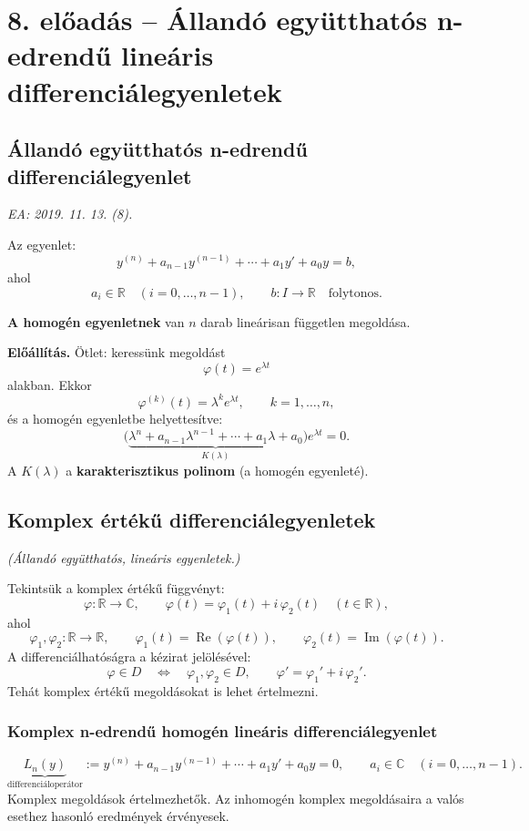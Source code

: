 \graphicspath{{lectures/08_eloadas_abrak/}}

\section{8. előadás -- Állandó együtthatós n-edrendű lineáris differenciálegyenletek}

\subsection{Állandó együtthatós n-edrendű differenciálegyenlet}
\textit{EA: 2019. 11. 13. (8).}

Az egyenlet:
\[
 y^{(n)}+a_{n-1}y^{(n-1)}+\cdots+a_1y'+a_0y=b,
\]
ahol
\[
 a_i\in\mathbb R\quad(i=0,\ldots,n-1),\qquad
 b:I\longrightarrow\mathbb R\quad\text{folytonos}.
\]

\textbf{A homogén egyenletnek} van $n$ darab lineárisan független
megoldása.

\textbf{Előállítás.} Ötlet: keressünk megoldást
\[
 \varphi(t)=e^{\lambda t}
\]
alakban. Ekkor
\[
 \varphi^{(k)}(t)=\lambda^k e^{\lambda t},
 \qquad k=1,\ldots,n,
\]
és a homogén egyenletbe helyettesítve:
\[
 \bigl(\underbrace{\lambda^n+a_{n-1}\lambda^{n-1}
              +\cdots+a_1\lambda+a_0}_{K(\lambda)}\bigr)
 e^{\lambda t}=0.
\]
A $K(\lambda)$ a \textbf{karakterisztikus polinom}
(a homogén egyenleté).

\subsection{Komplex értékű differenciálegyenletek}
\textit{(Állandó együtthatós, lineáris egyenletek.)}

Tekintsük a komplex értékű függvényt:
\[
 \varphi:\mathbb R\longrightarrow\mathbb C,\qquad
 \varphi(t)=\varphi_1(t)+i\,\varphi_2(t)
 \quad(t\in\mathbb R),
\]
ahol
\[
 \varphi_1,\varphi_2:\mathbb R\longrightarrow\mathbb R,\qquad
 \varphi_1(t)=\operatorname{Re}(\varphi(t)),\qquad
 \varphi_2(t)=\operatorname{Im}(\varphi(t)).
\]
A differenciálhatóságra a kézirat jelölésével:
\[
 \varphi\in D\quad\Longleftrightarrow\quad
 \varphi_1,\varphi_2\in D,
 \qquad \varphi'=\varphi_1'+i\,\varphi_2'.
\]
Tehát komplex értékű megoldásokat is lehet értelmezni.

\subsubsection*{Komplex n-edrendű homogén lineáris differenciálegyenlet}
\[
 \underbrace{L_n(y)}_{\text{differenciáloperátor}}
 :=y^{(n)}+a_{n-1}y^{(n-1)}+\cdots+a_1y'+a_0y=0,
 \qquad a_i\in\mathbb C\quad(i=0,\ldots,n-1).
 \tag{KH}
\]
Komplex megoldások értelmezhetők.
Az inhomogén komplex megoldásaira a valós esethez hasonló eredmények
érvényesek.

